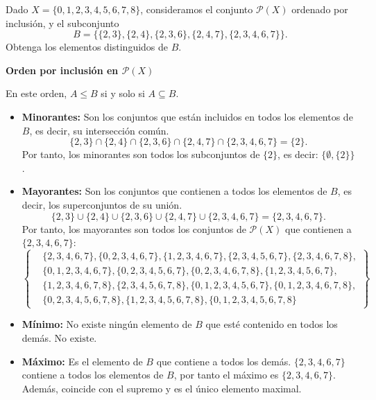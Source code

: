 \documentclass[a4paper,12pt]{article}
\begin{document}
\begin{ejercicio}[title=Ejercicio 18]
Dado $X = \{0,1,2,3,4,5,6,7,8\}$, consideramos el conjunto $\mathcal{P}(X)$ ordenado por inclusión, y
el subconjunto
\[
B = \{\{2,3\},\{2,4\},\{2,3,6\},\{2,4,7\},\{2,3,4,6,7\}\}.
\]
Obtenga los elementos distinguidos de $B$.
\tcblower

\textbf{Orden por inclusión en $\mathcal{P}(X)$}

En este orden, $A \le B$ si y solo si $A \subseteq B$.

\begin{itemize}
    \item \textbf{Minorantes:}  
    Son los conjuntos que están incluidos en todos los elementos de $B$, es decir, su intersección común.  
    \[
    \{2,3\} \cap \{2,4\} \cap \{2,3,6\} \cap \{2,4,7\} \cap \{2,3,4,6,7\} = \{2\}.
    \]
    Por tanto, los minorantes son todos los subconjuntos de $\{2\}$, es decir:  
    \(\boxed{\{\emptyset, \{2\}\}}\).

    \item \textbf{Mayorantes:}  
    Son los conjuntos que contienen a todos los elementos de $B$, es decir, los superconjuntos de su unión.  
    \[
    \{2,3\} \cup \{2,4\} \cup \{2,3,6\} \cup \{2,4,7\} \cup \{2,3,4,6,7\} = \{2,3,4,6,7\}.
    \]
    Por tanto, los mayorantes son todos los conjuntos de $\mathcal{P}(X)$ que contienen a $\{2,3,4,6,7\}$:
    \[
    \boxed{
\left\{
\begin{aligned}
& \{2,3,4,6,7\}, \{0,2,3,4,6,7\}, \{1,2,3,4,6,7\}, \{2,3,4,5,6,7\}, \{2,3,4,6,7,8\}, \\
& \{0,1,2,3,4,6,7\}, \{0,2,3,4,5,6,7\}, \{0,2,3,4,6,7,8\}, \{1,2,3,4,5,6,7\}, \\
& \{1,2,3,4,6,7,8\}, \{2,3,4,5,6,7,8\}, \{0,1,2,3,4,5,6,7\}, \{0,1,2,3,4,6,7,8\}, \\
& \{0,2,3,4,5,6,7,8\}, \{1,2,3,4,5,6,7,8\}, \{0,1,2,3,4,5,6,7,8\}
\end{aligned}
\right\}
}
    \]

    \item \textbf{Mínimo:}  
    No existe ningún elemento de $B$ que esté contenido en todos los demás.  
    \(\boxed{\text{No existe}}\).

    \item \textbf{Máximo:}  
    Es el elemento de $B$ que contiene a todos los demás.  
    \(\{2,3,4,6,7\}\) contiene a todos los elementos de $B$, por tanto el máximo es  
    \(\boxed{\{2,3,4,6,7\}}\).  
    Además, coincide con el supremo y es el único elemento maximal.


\end{itemize}
\end{ejercicio}
\end{document}

